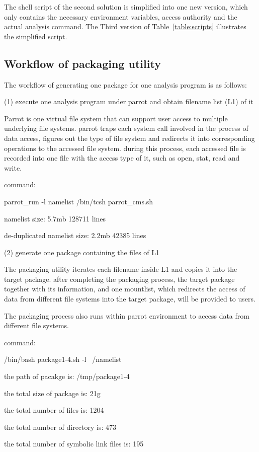\documentclass{acm_proc_article-sp}
\begin{document}
The shell script of the second solution is simplified into one new version, which only contains the necessary environment variables, access authority and the actual analysis command. The Third version of Table~\ref{table:scripts} illustrates the simplified script.

\subsection{Workflow of packaging utility}
The workflow of generating one package for one analysis program  is as follows:

(1) execute one analysis program under parrot and obtain filename list (L1) of it

Parrot is one virtual file system that can support user access to multiple underlying file systems. parrot traps each system call involved in the process of data access, figures out the type of file system and redirects it into corresponding operations to the accessed file system. during this process, each accessed file is recorded into one file with the access type of it, such as open, stat, read and write.

command:

parrot\_run -l namelist /bin/tcsh parrot\_cms.sh

namelist size: 5.7mb     128711 lines

de-duplicated namelist size: 2.2mb   42385 lines

(2) generate one package containing the files of L1 

The packaging utility iterates each filename inside L1 and copies it into the target package. after completing the packaging process, the target package together with its information, and one mountlist, which redirects the access of data from different file systems into the target package, will be provided to users.

The packaging process also runs within parrot environment to access data from different file systems.

command:

/bin/bash package1-4.sh -l ~/namelist

the path of pacakge is: /tmp/package1-4

the total size of package is: 21g

the total number of files is: 1204

the total number of directory is: 473

the total number of symbolic link files is: 195
\end{document}
